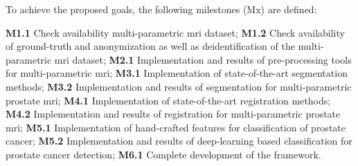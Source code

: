 To achieve the proposed goals, the following milestones (Mx) are defined:

\textbf{M1.1} Check availability multi-parametric \ac{mri} dataset;
\textbf{M1.2} Check availability of ground-truth and anonymization as well as deidentification of the multi-parametric \ac{mri} dataset;
\textbf{M2.1} Implementation and results of pre-processing tools for multi-parametric \ac{mri};
\textbf{M3.1} Implementation of state-of-the-art segmentation methods;
\textbf{M3.2} Implementation and results of segmentation for multi-parametric prostate \ac{mri};
\textbf{M4.1} Implementation of state-of-the-art registration methods;
\textbf{M4.2} Implementation and results of registration for multi-parametric prostate \ac{mri};
\textbf{M5.1} Implementation of hand-crafted features for classification of prostate cancer;
\textbf{M5.2} Implementation and results of deep-learning based classification for prostate cancer detection;
\textbf{M6.1} Complete development of the framework.


